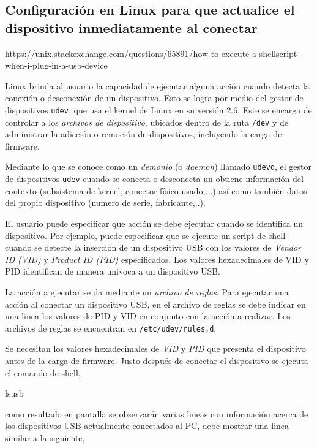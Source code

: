 \documentclass[paper=letter,oneside,fontsize=11pt, parskip=full]{scrartcl}
\newenvironment{code}
	{\begin{adjustwidth}{1.5cm}{0.0cm}\ttfamily}
	{\end{adjustwidth}}
\begin{document}
	\subsection{Configuración en Linux para que actualice el dispositivo inmediatamente al conectar}
	
	https://unix.stackexchange.com/questions/65891/how-to-execute-a-shellscript-when-i-plug-in-a-usb-device
	
	Linux brinda al usuario la capacidad de ejecutar alguna acción cuando detecta la conexión o desconexión de un dispositivo. Esto se logra por medio del gestor de dispositivos \texttt{udev}, que usa el kernel de Linux en su versión 2.6. Este se encarga de controlar a los \emph{archivos de dispositivo}, ubicados dentro de la ruta \texttt{/dev} y de administrar la adicción o remoción de dispositivos, incluyendo la carga de firmware.
	
	Mediante lo que se conoce como un \emph{demonio} (o \emph{daemon}) llamado \texttt{udevd}, el gestor de dispositivos \texttt{udev} cuando se conecta o desconecta un obtiene información del contexto (subsistema de kernel, conector físico usado,...) así como también datos del propio dispositivo (numero de serie, fabricante,..).
	
	El usuario puede especificar que acción se debe ejecutar cuando se identifica un dispositivo. Por ejemplo, puede especificar que se ejecute un script de shell cuando se detecte la inserción de un dispositivo USB con los valores de \emph{Vendor ID (VID)} y \emph{Product ID (PID)} especificados. Los valores hexadecimales de VID y PID identifican de manera univoca a un dispositivo USB.
	
	La acción a ejecutar se da mediante un \emph{archivo de reglas}. Para ejecutar una acción al conectar un dispositivo USB, en el archivo de reglas se debe indicar en una linea los valores de PID y VID en conjunto con la acción a realizar. Los archivos de reglas se encuentran en \texttt{/etc/udev/rules.d}.
	
	Se necesitan los valores hexadecimales de \emph{VID} y \emph{PID} que presenta el dispositivo antes de la carga de firmware. Justo después de conectar el dispositivo se ejecuta el comando de shell,
		
	\begin{code}
		lsusb
	\end{code}

	como resultado en pantalla se observarán varias lineas con información acerca de los dispositivos USB actualmente conectados al PC, debe mostrar una linea similar a la siguiente,	
\end{document}
